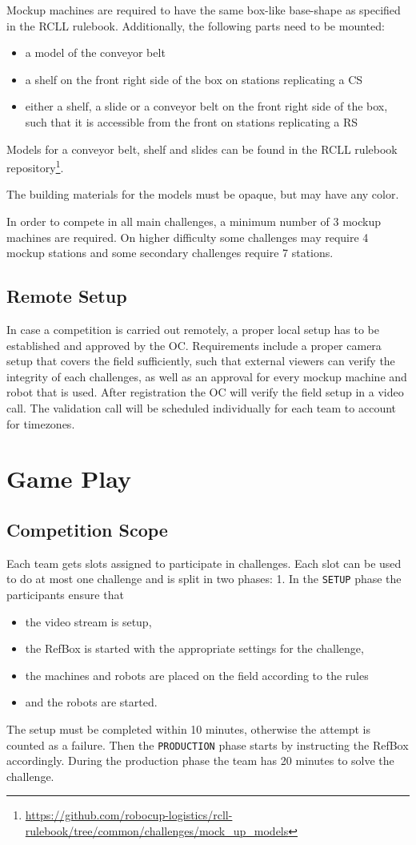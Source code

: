 \documentclass[12pt,twoside]{article}
\begin{document}
Mockup machines are required to have the same box-like base-shape as specified
in the RCLL rulebook.
Additionally, the following parts need to be mounted:
\begin{itemize}
	\item a model of the conveyor belt
	\item a shelf on the front right side of the box on stations replicating a \ac{CS}
	\item either a shelf, a slide or a conveyor belt on the front right side
of the box, such that it is accessible from the front on stations replicating a \ac{RS}
\end{itemize}
Models for a conveyor belt, shelf and slides can be found in the RCLL rulebook
repository\footnote{\url{https://github.com/robocup-logistics/rcll-rulebook/tree/common/challenges/mock_up_models}}.

The building materials for the models must be opaque, but may have any color.

In order to compete in all main challenges, a minimum number of 3 mockup
machines are required. On higher difficulty some challenges may require
4 mockup stations and some secondary challenges require 7 stations.

\subsection{Remote Setup}
In case a competition is carried out remotely, a proper local setup has to
be established and approved by the OC.
Requirements include a proper camera setup that covers the field sufficiently,
such that external viewers can verify the integrity of each challenges,
as well as an approval for every mockup machine and robot that is used.
After registration the OC will verify the field setup in a video call.
The validation call will be scheduled individually for each team
to account for timezones.

\section{Game Play}
\subsection{Competition Scope}
Each team gets slots assigned to participate in challenges.
Each slot can be used to do at most one challenge and is split in two phases:
1. In the \texttt{SETUP} phase the participants ensure that
\begin{itemize}
	\item the video stream is setup,
	\item the RefBox is started with the appropriate settings for the challenge,
	\item the machines and robots are placed on the field according to the rules
	\item and the robots are started.
\end{itemize}
The setup must be completed within 10 minutes, otherwise the attempt is counted
as a failure.
Then the \texttt{PRODUCTION} phase starts by instructing the RefBox accordingly.
During the production phase the team has 20 minutes to solve the challenge.
\end{document}
